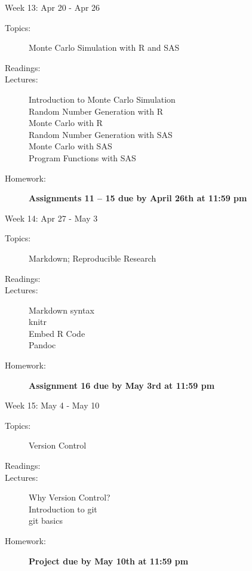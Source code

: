 \documentclass[11pt,article,oneside]{memoir}
\newcounter{schedule}
\begin{document}
\begin{schedule}{Week 13: Apr 20 - Apr 26}
\begin{description}
\item[Topics:] Monte Carlo Simulation with R and SAS

\item[Readings:] 

\item[Lectures:] Introduction to Monte Carlo Simulation \\ Random Number Generation with R \\ Monte Carlo with R \\ Random Number Generation with SAS \\ Monte Carlo with SAS \\ Program Functions with SAS 

\item[Homework:] \textbf{Assignments 11 -- 15 due by April 26th at 11:59 pm}

\end{description}
\end{schedule}
\begin{schedule}{Week 14: Apr 27 - May 3}
\begin{description}
\item[Topics:] Markdown; Reproducible Research

\item[Readings:] 

\item[Lectures:] Markdown syntax \\ knitr \\ Embed R Code \\ Pandoc

\item[Homework:] \textbf{Assignment 16 due by May 3rd at 11:59 pm}

\end{description}
\end{schedule}
\begin{schedule}{Week 15: May 4 - May 10}
\begin{description}
\item[Topics:] Version Control

\item[Readings:] 

\item[Lectures:] Why Version Control? \\ Introduction to git \\ git basics

\item[Homework:] \textbf{Project due by May 10th at 11:59 pm}

\end{description}
\end{schedule}
\end{document}
